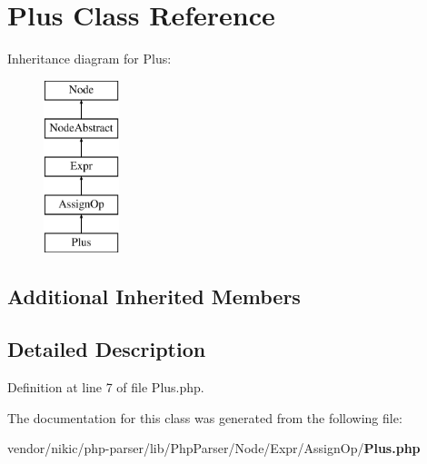 \section{Plus Class Reference}
\label{class_php_parser_1_1_node_1_1_expr_1_1_assign_op_1_1_plus}
Inheritance diagram for Plus\+:\begin{figure}[H]
\begin{center}
\leavevmode
\includegraphics[height=5.000000cm]{class_php_parser_1_1_node_1_1_expr_1_1_assign_op_1_1_plus}
\end{center}
\end{figure}
\subsection*{Additional Inherited Members}


\subsection{Detailed Description}


Definition at line 7 of file Plus.\+php.



The documentation for this class was generated from the following file\+:\begin{DoxyCompactItemize}
\item 
vendor/nikic/php-\/parser/lib/\+Php\+Parser/\+Node/\+Expr/\+Assign\+Op/{\bf Plus.\+php}\end{DoxyCompactItemize}

